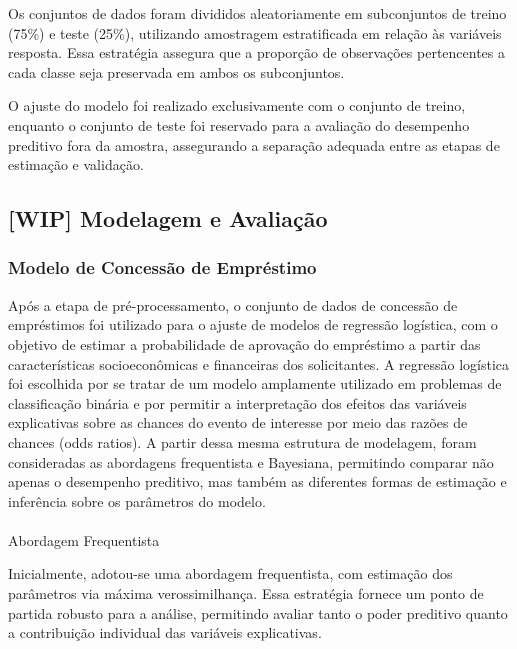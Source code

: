 \documentclass[
  brazilian,
  12pt,
  letterpaper,
  DIV=11,
  numbers=noendperiod]{scrartcl}
\makeatletter
\let\oldparagraph\paragraph
\renewcommand{\paragraph}{
    \@ifstar
      \xxxParagraphStar
      \xxxParagraphNoStar
  }
\newcommand{\xxxParagraphStar}[1]{\oldparagraph*{#1}\mbox{}}
\newcommand{\xxxParagraphNoStar}[1]{\oldparagraph{#1}\mbox{}}
\makeatother
\begin{document}
Os conjuntos de dados foram divididos aleatoriamente em subconjuntos de
treino (75\%) e teste (25\%), utilizando amostragem estratificada em
relação às variáveis resposta. Essa estratégia assegura que a proporção
de observações pertencentes a cada classe seja preservada em ambos os
subconjuntos.

O ajuste do modelo foi realizado exclusivamente com o conjunto de
treino, enquanto o conjunto de teste foi reservado para a avaliação do
desempenho preditivo fora da amostra, assegurando a separação adequada
entre as etapas de estimação e validação.

\subsection{{[}WIP{]} Modelagem e
Avaliação}\label{wip-modelagem-e-avaliauxe7uxe3o}

\subsubsection{Modelo de Concessão de
Empréstimo}\label{modelo-de-concessuxe3o-de-empruxe9stimo}

Após a etapa de pré-processamento, o conjunto de dados de concessão de
empréstimos foi utilizado para o ajuste de modelos de regressão
logística, com o objetivo de estimar a probabilidade de aprovação do
empréstimo a partir das características socioeconômicas e financeiras
dos solicitantes. A regressão logística foi escolhida por se tratar de
um modelo amplamente utilizado em problemas de classificação binária e
por permitir a interpretação dos efeitos das variáveis explicativas
sobre as chances do evento de interesse por meio das razões de chances
(odds ratios). A partir dessa mesma estrutura de modelagem, foram
consideradas as abordagens frequentista e Bayesiana, permitindo comparar
não apenas o desempenho preditivo, mas também as diferentes formas de
estimação e inferência sobre os parâmetros do modelo.

\paragraph{Abordagem Frequentista}\label{abordagem-frequentista}

Inicialmente, adotou-se uma abordagem frequentista, com estimação dos
parâmetros via máxima verossimilhança. Essa estratégia fornece um ponto
de partida robusto para a análise, permitindo avaliar tanto o poder
preditivo quanto a contribuição individual das variáveis explicativas.
\end{document}
